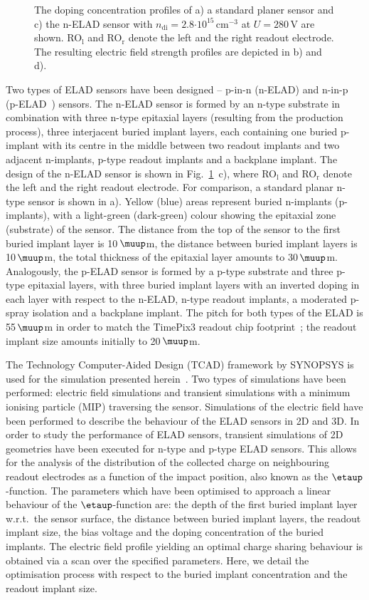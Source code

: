 \documentclass[a4paper,11pt]{article}
\begin{document}
\begin{figure}[t!]
  \hfill 
  \caption{
The doping concentration profiles of a) a standard planer sensor and c) the n-ELAD sensor with $n\mathrm{_{di}} = 2.8\mathrm{\cdot10^{15}\,cm^{-3}}$ at $U=280$\,V are shown. 
RO$_{\textrm{l}}$ and RO$_{\textrm{r}}$ denote the left and the right readout electrode.
The resulting electric field strength profiles are depicted in b) and d).
}
  \label{fig:el}
\end{figure}


Two types of ELAD sensors have been designed -- p-in-n (n-ELAD) and n-in-p (p-ELAD~\cite{elad}) sensors.
The n-ELAD sensor is formed by an n-type substrate in combination with three n-type epitaxial layers (resulting from the production process),
 three interjacent buried implant layers, each containing one buried p-implant with its centre in the middle between two readout implants and two adjacent n-implants,
 p-type readout implants and a backplane implant.
The design of the n-ELAD sensor is shown in Fig.~\ref{fig:el}~c), where RO$_{\textrm{l}}$ and RO$_{\textrm{r}}$ denote the left and the right readout electrode.
For comparison, a standard planar n-type sensor is shown in a).
Yellow (blue) areas represent buried n-implants (p-implants), with a light-green (dark-green) colour showing the epitaxial zone (substrate) of the sensor. 
The distance from the top of the sensor to the first buried implant layer is 10\,$\muup$m, the distance between buried implant layers is 10\,$\muup$m, the total thickness of the epitaxial layer amounts to 30\,$\muup$m.
Analogously, the p-ELAD sensor is formed by a p-type substrate and three p-type epitaxial layers,
 with three buried implant layers with an inverted doping in each layer with respect to the n-ELAD,
 n-type readout implants, a moderated p-spray isolation and a backplane implant.
The pitch for both types of the ELAD is 55\,$\muup$m in order to match the TimePix3 readout chip footprint~\cite{tp3}; the readout implant size amounts initially to 20\,$\muup$m.

The Technology Computer-Aided Design (TCAD) framework by SYNOPSYS is used for the simulation presented herein~\cite{syn}.
Two types of simulations have been performed: electric field simulations and transient simulations with a minimum ionising particle (MIP) traversing the sensor.
Simulations of the electric field have been performed to describe the behaviour of the ELAD sensors in 2D and 3D.
In order to study the performance of ELAD sensors, transient simulations of 2D geometries have been executed for n-type and p-type ELAD sensors.
This allows for the analysis of the distribution of the collected charge on neighbouring readout electrodes as a function of the impact position, also known as the $\etaup$-function.
The parameters which have been optimised to approach a linear behaviour of the $\etaup$-function are: the depth of the first buried implant layer w.r.t.\ the sensor surface, the distance between buried implant layers,
 the readout implant size, the bias voltage and the doping concentration of the buried implants. 
The electric field profile yielding an optimal charge sharing behaviour is obtained via a scan over the specified parameters.
Here, we detail the optimisation process with respect to the buried implant concentration and the readout implant size.
\end{document}
